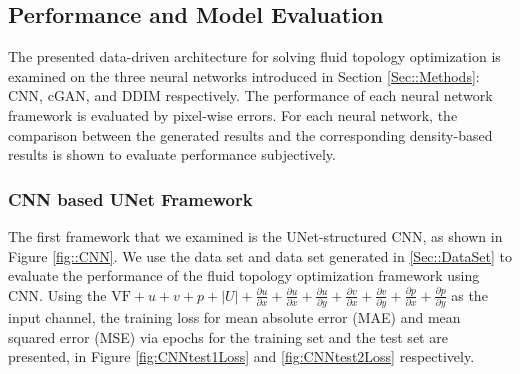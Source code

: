 \documentclass{article}
\begin{document}
\subsection{Performance and Model Evaluation}
The presented data-driven architecture for solving fluid topology optimization is examined on the three neural networks introduced in Section \ref{Sec::Methods}: CNN, cGAN, and DDIM respectively. The performance of each neural network framework is evaluated by pixel-wise errors. For each neural network, the comparison between the generated results and the corresponding density-based results is shown to evaluate performance subjectively.
\subsubsection{CNN based UNet Framework}
The first framework that we examined is the UNet-structured CNN, as shown in Figure \ref{fig::CNN}. 
We use the data set \uppercase\expandafter{} and data set \uppercase\expandafter{} generated in \ref{Sec::DataSet} to evaluate the performance of the fluid topology optimization framework using CNN. Using the $\mathrm{VF}+u + v + p + |U| + \frac{\partial u}{\partial x} + \frac{\partial u}{\partial x}+ \frac{\partial u}{\partial y}+ \frac{\partial v}{\partial x}+ \frac{\partial v}{\partial y} + \frac{\partial p}{\partial x} + \frac{\partial p}{\partial y}$ as the input channel, 
the training loss for mean absolute error (MAE) and mean squared error (MSE) via epochs for the training set and the test set are presented, in Figure \ref{fig:CNNtest1Loss} and \ref{fig:CNNtest2Loss} respectively. 
\end{document}
